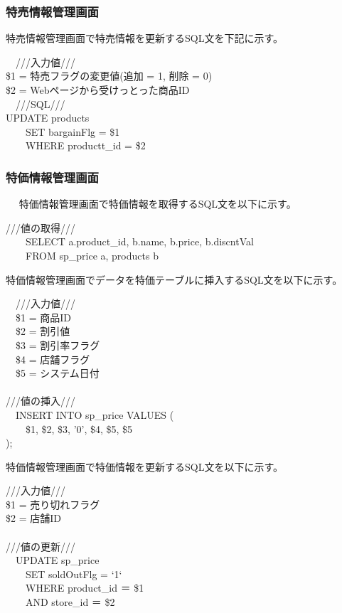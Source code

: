 \documentclass[a4j]{jarticle}
\begin{document}
\subsubsection{特売情報管理画面}
特売情報管理画面で特売情報を更新するSQL文を下記に示す。
\begin{screen}
  　///入力値///\\
  \$1 = 特売フラグの変更値(追加 = 1, 削除 = 0)\\
  \$2 = Webページから受けっとった商品ID
  \\
  　///SQL///\\
  UPDATE products\\
  　　SET bargainFlg = \$1\\
  　　WHERE productt\_id = \$2
\end{screen}


\subsubsection{特価情報管理画面}　
特価情報管理画面で特価情報を取得するSQL文を以下に示す。

\begin{screen}
  ///値の取得///\\
  　　SELECT a.product\_id, b.name, b.price, b.discntVal\\
  　　FROM sp\_price a, products b
\end{screen}

特価情報管理画面でデータを特価テーブルに挿入するSQL文を以下に示す。

\begin{screen}
  　///入力値///\\
  　\$1 = 商品ID\\
  　\$2 = 割引値\\
  　\$3 = 割引率フラグ\\
  　\$4 = 店舗フラグ\\
  　\$5 = システム日付\\
  \\
  ///値の挿入///\\
  　INSERT INTO sp\_price VALUES (\\
  　　\$1, \$2, \$3, '0', \$4, \$5, \$5\\
  );
\end{screen}

特価情報管理画面で特価情報を更新するSQL文を以下に示す。

\begin{screen}
  ///入力値///\\
  \$1 = 売り切れフラグ\\
  \$2 = 店舗ID\\
  \\
  ///値の更新///\\
  　UPDATE sp\_price\\
  　　SET soldOutFlg = `1`\\
  　　WHERE product\_id ＝ \$1\\
  　　AND store\_id ＝ \$2
\end{screen}
\end{document}
